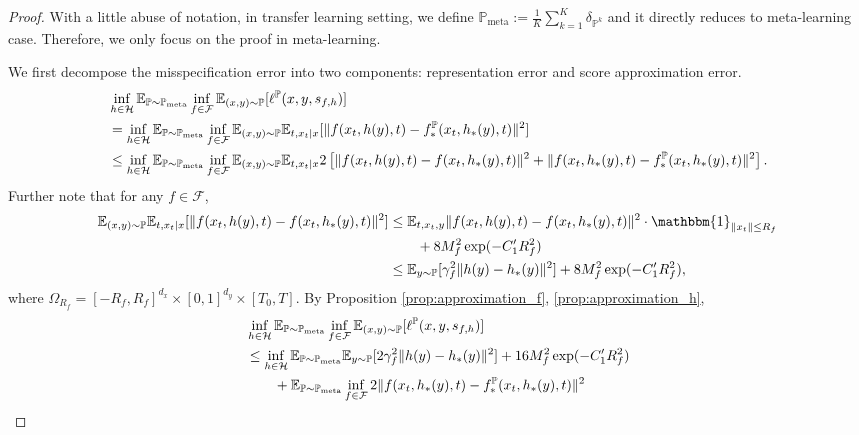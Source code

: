 \documentclass[11pt]{article}
\numberwithin{equation}{section}
\newcommand{\Pmeta}{\mathbb{P}_{\text{meta}}}
\renewcommand{\P}{\mathbb{P}}
\begin{document}
\begin{proof}
    With a little abuse of notation, in transfer learning setting, we define $\Pmeta:=\frac{1}{K}\sum_{k=1}^K\delta_{\P^k}$ and it directly reduces to meta-learning case.
    Therefore, we only focus on the proof in meta-learning.
    
    We first decompose the misspecification error into two components: representation error and score approximation error.
    \begin{equation}
        \begin{aligned}
            &\inf_{h\in\mathcal{H}}\E_{\P\sim\Pmeta}\inf_{f\in\mathcal{F}}\E_{(x,y)\sim\P} [\ell^\P(x,y,s_{f,h})] \\
            &= \inf_{h\in\mathcal{H}}\E_{\P\sim\Pmeta}\inf_{f\in\mathcal{F}}\E_{(x,y)\sim\P}\E_{t,x_t|x} [\|f(x_t,h(y),t)-f_*^\P(x_t,h_*(y),t)\|^2] \\
            &\leq \inf_{h\in\mathcal{H}}\E_{\P\sim\Pmeta}\inf_{f\in\mathcal{F}}\E_{(x,y)\sim\P}\E_{t,x_t|x} 2\left[\|f(x_t,h(y),t)-f(x_t,h_*(y),t)\|^2+\|f(x_t,h_*(y),t)-f_*^\P(x_t,h_*(y),t)\|^2\right].
        \end{aligned}
    \end{equation}
    Further note that for any $f\in\mathcal{F}$, 
    \begin{equation}
        \begin{aligned}
            \E_{(x,y)\sim\P}\E_{t,x_t|x} [\|f(x_t,h(y),t)-f(x_t,h_*(y),t)\|^2]
            &\leq \E_{t,x_t,y} \|f(x_t,h(y),t)-f(x_t,h_*(y),t)\|^2\cdot \mathbbm{1}_{\|x_t\|\leq R_f} \\
            &\qquad + 8M_f^2\exp(-C_1'R_f^2) \\
            &\leq \E_{y\sim\P}[\gamma_f^2\|h(y)-h_*(y)\|^2] + 8M_f^2\exp(-C_1'R_f^2),
        \end{aligned}
    \end{equation}
    where $\Omega_{R_f}=[-R_f,R_f]^{d_x}\times[0,1]^{d_y}\times[T_0,T]$.
    By Proposition \ref{prop:approximation_f}, \ref{prop:approximation_h},
    \begin{equation}
        \begin{aligned}
            &\inf_{h\in\mathcal{H}}\E_{\P\sim\Pmeta}\inf_{f\in\mathcal{F}}\E_{(x,y)\sim\P} [\ell^\P(x,y,s_{f,h})] \\
            &\leq 
            \inf_{h\in\mathcal{H}}\E_{\P\sim\Pmeta}\E_{y\sim\P}[2\gamma_f^2\|h(y)-h_*(y)\|^2] + 16M_f^2\exp(-C_1'R_f^2) \\
            &\qquad +\E_{\P\sim\Pmeta}\inf_{f\in\mathcal{F}}2\|f(x_t,h_*(y),t)-f_*^\P(x_t,h_*(y),t)\|^2 \\

\end{aligned}
\end{equation}
\end{proof}
\end{document}
